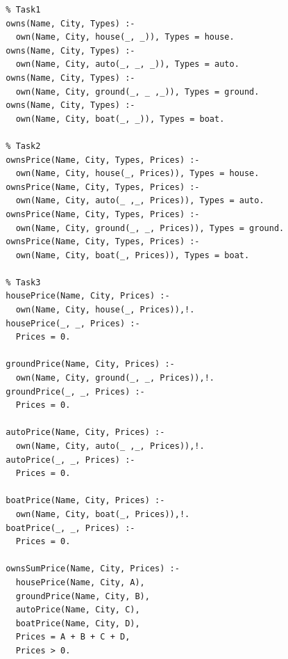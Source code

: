 \documentclass[a4paper,14pt]{extreport} %
\begin{document}
\begin{lstlisting}
  % Task1
  owns(Name, City, Types) :-
    own(Name, City, house(_, _)), Types = house.
  owns(Name, City, Types) :-
    own(Name, City, auto(_, _, _)), Types = auto.
  owns(Name, City, Types) :-
    own(Name, City, ground(_, _ ,_)), Types = ground.
  owns(Name, City, Types) :-
    own(Name, City, boat(_, _)), Types = boat.
  
  % Task2
  ownsPrice(Name, City, Types, Prices) :-
    own(Name, City, house(_, Prices)), Types = house.
  ownsPrice(Name, City, Types, Prices) :-
    own(Name, City, auto(_ ,_, Prices)), Types = auto.
  ownsPrice(Name, City, Types, Prices) :-
    own(Name, City, ground(_, _, Prices)), Types = ground.
  ownsPrice(Name, City, Types, Prices) :-
    own(Name, City, boat(_, Prices)), Types = boat.
  
  % Task3  
  housePrice(Name, City, Prices) :- 
    own(Name, City, house(_, Prices)),!.
  housePrice(_, _, Prices) :- 
    Prices = 0.
    
  groundPrice(Name, City, Prices) :- 
    own(Name, City, ground(_, _, Prices)),!.
  groundPrice(_, _, Prices) :- 
    Prices = 0.
    
  autoPrice(Name, City, Prices) :- 
    own(Name, City, auto(_ ,_, Prices)),!.
  autoPrice(_, _, Prices) :- 
    Prices = 0.
  
  boatPrice(Name, City, Prices) :- 
    own(Name, City, boat(_, Prices)),!.
  boatPrice(_, _, Prices) :- 
    Prices = 0.
      
  ownsSumPrice(Name, City, Prices) :-
    housePrice(Name, City, A),
    groundPrice(Name, City, B),
    autoPrice(Name, City, C),
    boatPrice(Name, City, D),
    Prices = A + B + C + D,
    Prices > 0.
\end{lstlisting}
\end{document}

